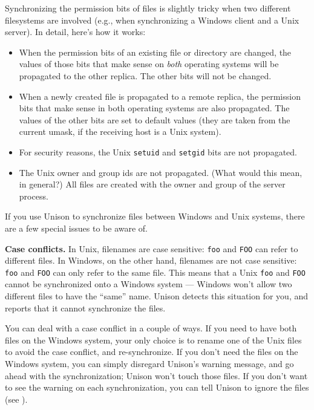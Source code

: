 \documentclass{article}
\begin{document}

Synchronizing the permission bits of files is slightly tricky when two
different filesystems are involved (e.g., when synchronizing a Windows
client and a Unix server).  In detail, here's how it works:
\begin{itemize}
\item When the permission bits of an existing file or directory are
changed, the values of those bits that make sense on {\em both}
operating systems will be propagated to the other replica.  The other
bits will not be changed.
\item When a newly created file is propagated to a remote replica, the
permission bits that make sense in both operating systems are also
propagated.  The values of the other bits are set to default values
(they are taken from the current umask, if the receiving host is a
Unix system).
\item For security reasons, the Unix \verb|setuid| and \verb|setgid|
bits are not propagated.
\item The Unix owner and group ids are not propagated.  (What would
this mean, in general?)  All files are created with the owner and
group of the server process.
\end{itemize}



If you use Unison to synchronize files between Windows and Unix
systems, there are a few special issues to be aware of.

\textbf{Case conflicts.}  In Unix, filenames are case sensitive:
\texttt{foo} and \texttt{FOO} can refer to different files.  In
Windows, on the other hand, filenames are not case sensitive:
\texttt{foo} and \texttt{FOO} can only refer to the same file.  This
means that a Unix \texttt{foo} and \texttt{FOO} cannot be synchronized
onto a Windows system --- Windows won't allow two different files to
have the ``same'' name.  Unison detects this situation for you, and
reports that it cannot synchronize the files.

You can deal with a case conflict in a couple of ways.  If you need to
have both files on the Windows system, your only choice is to rename
one of the Unix files to avoid the case conflict, and re-synchronize.
If you don't need the files on the Windows system, you can simply
disregard Unison's warning message, and go ahead with the
synchronization; Unison won't touch those files.  If you don't want to
see the warning on each synchronization, you can tell Unison to ignore
the files (see ).
\end{document}
